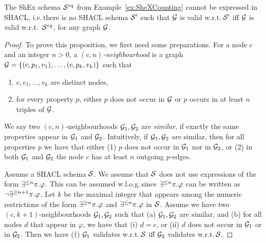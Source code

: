 \begin{proposition}\label{prop:shacl-inexp}
  The ShEx schema $\mathcal{S}^{eq}$ from Example~\ref{ex:SheXCounting}
  cannot be expressed in SHACL, i.e.\,there is no  SHACL schema $\mathcal{S}'$ such that $\mathcal{G}$ is valid w.r.t.\,$\mathcal{S}'$ iff $\mathcal{G}$ is valid w.r.t.\, $\mathcal{S}^{eq}$, for any graph $\mathcal{G}$. 
\end{proposition}
\begin{proof}
To prove this proposition, we first need some preparations. For a node $c$ and an integer $n>0$, a \emph{$(c,n)$-neighbourhood} is a graph $\mathcal{G}=\{(c,p_1,v_1),\ldots,(c,p_k,v_k)\}$ such that 
\begin{enumerate}
    \item $c,v_1,\ldots,v_k$ are distinct nodes,
    \item for every property $p$, either $p$ does not occur in $\mathcal{G}$ or $p$ occurs in at least $n$ triples of $\mathcal{G}$. 
  \end{enumerate}
We say two $(c,n)$-neighbourhoods $\mathcal{G}_1,\mathcal{G}_2$ are \emph{similar}, if exactly the same properties appear in $\mathcal{G}_1$ and $\mathcal{G}_2$. Intuitively, if $\mathcal{G}_1,\mathcal{G}_2$ are similar, then for all properties $p$  we have that either (1) $p$ does not occur in $\mathcal{G}_1$ nor in  $\mathcal{G}_2$, or (2) in both $\mathcal{G}_1$ and $\mathcal{G}_2$ the node $c$ has at least $n$ outgoing $p$-edges.

Assume a SHACL schema $\mathcal{S}$. We assume that $\mathcal{S}$ does not use expressions of the form $\exists^{\leq n}\pi.{\varphi}$. This can be assumed w.l.o.g.\,since $\exists^{\leq n}\pi.{\varphi}$  can be written as $\neg \exists^{\geq n+1}\pi.{\varphi}$. Let $k$ be the maximal integer that appears among the numeric restrictions of the form  $\exists^{\geq n}\pi.{\varphi}$ and $\exists^{\leq n}\pi.{\varphi}$ in $\mathcal{S}$. Assume we have two 
$(c,k+1)$-neighbourhoods $\mathcal{G}_1,\mathcal{G}_2$ such that (a) $\mathcal{G}_1,\mathcal{G}_2$ are similar, and (b) 
for all nodes $d$ that appear in $\varphi$,  we have that  (i) $d=c$, or (ii)  $d$ does not occur in $\mathcal{G}_1$ or in  $\mathcal{G}_2$. Then we have ($\dagger$) $\mathcal{G}_1$ validates w.r.t.\,$\mathcal{S}$ iff $\mathcal{G}_2$ validates w.r.t.\,$\mathcal{S}$. 


\end{proof}
